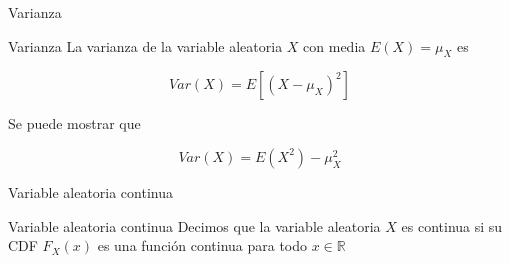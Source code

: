 \documentclass{beamer}
\begin{document}
\begin{frame}{Varianza}

\begin{block}{Varianza}
La varianza de la variable aleatoria $X$ con media $E(X)=\mu_X$ es

\begin{equation*}
    Var(X)=E[(X-\mu_X)^2]
\end{equation*}
    
\end{block}

    Se puede mostrar que

    \begin{equation*}
        Var(X)=E(X^2)-\mu^2_X
    \end{equation*}
\end{frame}

\begin{frame}{Variable aleatoria continua}

\begin{block}{Variable aleatoria continua}
    Decimos que la variable aleatoria $X$ es continua si su CDF $F_X(x)$ es una función continua para todo $x \in \mathbb{R}$
\end{block}
    
\end{frame}


\printbibliography
\end{document}
